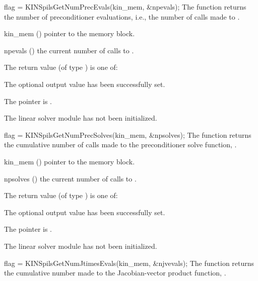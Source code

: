 {}
{
  flag = KINSpilsGetNumPrecEvals(kin\_mem, \&npevals);
}
{
  The function  returns the
  number of preconditioner evaluations, i.e., the number of 
  calls made to .
}
{
  \begin{args}
  \item[kin\_mem] ()
    pointer to the {\kinsol} memory block.
  \item[npevals] ()
    the current number of calls to .
  \end{args}
}
{
  The return value  (of type ) is one of:
  \begin{args}
  \item[\Id{KINSPILS\_SUCCESS}] 
    The optional output value has been successfully set.
  \item[\Id{KINSPILS\_MEM\_NULL}]
    The  pointer is .
  \item[\Id{KINSPILS\_LMEM\_NULL}]
    The linear solver module has not been initialized.
  \end{args}
}
{}
{
  flag = KINSpilsGetNumPrecSolves(kin\_mem, \&npsolves);
}
{
  The function  returns the
  cumulative number of calls made to the preconditioner 
  solve function, .
}
{
  \begin{args}
  \item[kin\_mem] ()
    pointer to the {\kinsol} memory block.
  \item[npsolves] ()
    the current number of calls to .
  \end{args}
}
{
  The return value  (of type ) is one of:
  \begin{args}
  \item[\Id{KINSPILS\_SUCCESS}] 
    The optional output value has been successfully set.
  \item[\Id{KINSPILS\_MEM\_NULL}]
    The  pointer is .
  \item[\Id{KINSPILS\_LMEM\_NULL}]
    The linear solver module has not been initialized.
  \end{args}
}
{}
{
  flag = KINSpilsGetNumJtimesEvals(kin\_mem, \&njvevals);
}
{
  The function  returns the
  cumulative number made to the Jacobian-vector product function,
  .
}
